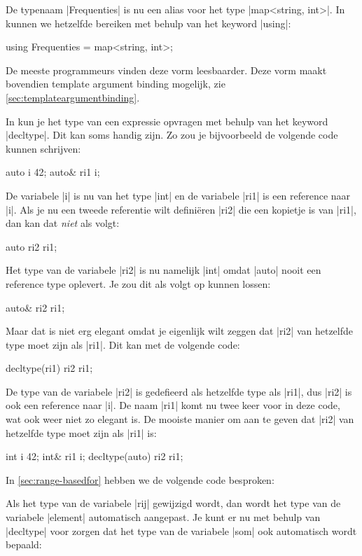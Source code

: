\begin{cpplstShortInline}
De typenaam |Frequenties| is nu een alias voor het type |map<string, int>|.
In \Cpp{} kunnen we hetzelfde bereiken met behulp van het keyword |using|:

\begin{cpplstfragment}
	using Frequenties = map<string, int>;
\end{cpplstfragment}

De meeste programmeurs vinden deze vorm leesbaarder.
Deze vorm maakt bovendien template argument binding mogelijk, zie \cref{sec:templateargumentbinding}.

\label{decltype}
In \Cpp{} kun je het type van een expressie opvragen met behulp van het keyword |decltype|.
Dit kan soms handig zijn.
Zo zou je bijvoorbeeld de volgende code kunnen schrijven:
\begin{cpplstfragment}
	auto i {42};
	auto& ri1 {i};
\end{cpplstfragment}
De variabele |i| is nu van het type |int| en de variabele |ri1| is een reference naar |i|.
Als je nu een tweede referentie wilt definiëren |ri2| die een kopietje is van |ri1|, dan kan dat \emph{niet} als volgt:
\begin{cpplstfragment}
	auto ri2 {ri1};
\end{cpplstfragment}
Het type van de variabele |ri2| is nu namelijk |int| omdat |auto| nooit een reference type oplevert.
Je zou dit als volgt op kunnen lossen:
\begin{cpplstfragment}
	auto& ri2 {ri1};
\end{cpplstfragment}
Maar dat is niet erg elegant omdat je eigenlijk wilt zeggen dat |ri2| van hetzelfde type moet zijn als |ri1|.
Dit kan met de volgende code:
\begin{cpplstfragment}
	decltype(ri1) ri2 {ri1};
\end{cpplstfragment}
De type van de variabele |ri2| is gedefieerd als hetzelfde type als |ri1|, dus |ri2| is ook een reference naar |i|.
De naam |ri1| komt nu twee keer voor in deze code, wat ook weer niet zo elegant is.
De mooiste manier om aan te geven dat |ri2| van hetzelfde type moet zijn als |ri1| is:
\begin{cpplstfragment}
	int i {42};
	int& ri1 {i};
	decltype(auto) ri2 {ri1};
\end{cpplstfragment}

In \cref{sec:range-basedfor} hebben we de volgende code besproken:

Als het type van de variabele |rij| gewijzigd wordt, dan wordt het type van de variabele |element| automatisch aangepast.
Je kunt er nu met behulp van |decltype| voor zorgen dat het type van de variabele |som| ook automatisch wordt bepaald:


\end{cpplstShortInline}
